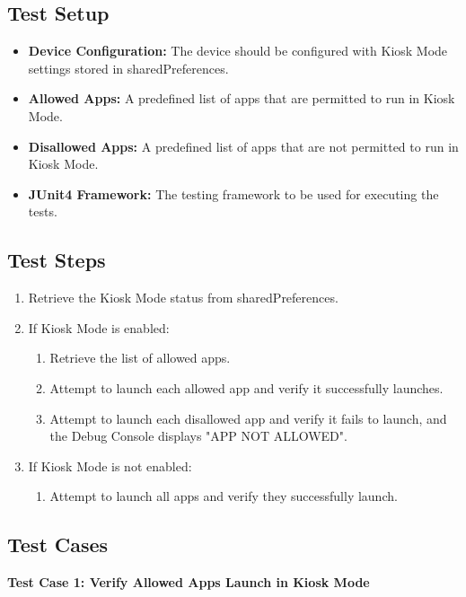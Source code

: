   \subsection{Test Setup}

  \begin{itemize}
    \item \textbf{Device Configuration:} The device should be configured with Kiosk Mode settings stored in sharedPreferences.
    \item \textbf{Allowed Apps:} A predefined list of apps that are permitted to run in Kiosk Mode.
    \item \textbf{Disallowed Apps:} A predefined list of apps that are not permitted to run in Kiosk Mode.
    \item \textbf{JUnit4 Framework:} The testing framework to be used for executing the tests.
  \end{itemize}

  \subsection{Test Steps}

  \begin{enumerate}
    \item Retrieve the Kiosk Mode status from sharedPreferences.
    \item If Kiosk Mode is enabled:
    \begin{enumerate}
      \item Retrieve the list of allowed apps.
      \item Attempt to launch each allowed app and verify it successfully launches.
      \item Attempt to launch each disallowed app and verify it fails to launch, and the Debug Console displays "APP NOT ALLOWED".
    \end{enumerate}
    \item If Kiosk Mode is not enabled:
    \begin{enumerate}
      \item Attempt to launch all apps and verify they successfully launch.
    \end{enumerate}
  \end{enumerate}

  \subsection{Test Cases}

  \textbf{Test Case 1: Verify Allowed Apps Launch in Kiosk Mode}

